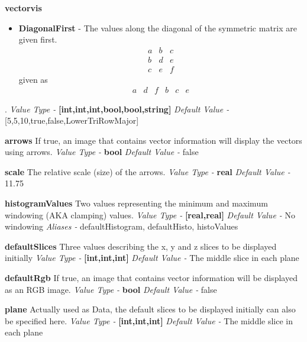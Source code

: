 \documentclass{article}
\newenvironment{componentoption}[1]%
{\textbf{#1}\newline}
{\newline}
\newcommand{\aliases}[1] {\newline \textit{Aliases - } #1}
\newcommand{\defaultvalue}[1] {\newline \textit{Default Value - } #1}
\newcommand{\valuetype}[1] {\newline \textit{Value Type - } \textbf{#1}}
\begin{document}
\begin{componentoption}{vectorvis}
\begin{itemize}
\begin{itemize}
		\item \textbf{DiagonalFirst} - The values along the diagonal of the symmetric matrix are given first.
\[	 
		\begin{matrix}
			a & b & c \\
			b & d & e \\
			c & e & f 
		\end{matrix}
\]
		given as
\[
		\begin{array} {cccccc}
		a & d & f & b & c & e 
		\end{array}
\]

	\end{itemize}

\end{itemize}
.
\valuetype{[int,int,int,bool,bool,string]}
\defaultvalue{[5,5,10,true,false,LowerTriRowMajor]}
\end{componentoption}

\begin{componentoption}{arrows}
If true, an image that contains vector information will display the vectors using arrows.
\valuetype{bool}
\defaultvalue{false}
\end{componentoption}

\begin{componentoption}{scale}
The relative scale (size) of the arrows.
\valuetype{real}
\defaultvalue{11.75}
\end{componentoption}

\begin{componentoption}{histogramValues}
Two values representing the minimum and maximum windowing (AKA clamping) values.
\valuetype{[real,real]}
\defaultvalue{No windowing}
\aliases{defaultHistogram, defaultHisto, histoValues}
\end{componentoption}

\begin{componentoption}{defaultSlices}
Three values describing the x, y and z slices to be displayed initially
\valuetype{[int,int,int]}
\defaultvalue{The middle slice in each plane}
\end{componentoption}

\begin{componentoption}{defaultRgb}
If true, an image that contains vector information will be displayed as an RGB image.
\valuetype{bool}
\defaultvalue{false}
\end{componentoption}

\begin{componentoption}{plane}
Actually used as Data, the default slices to be displayed initially can also be specified here.
\valuetype{[int,int,int]}
\defaultvalue{The middle slice in each plane}
\end{componentoption}
\end{document}
